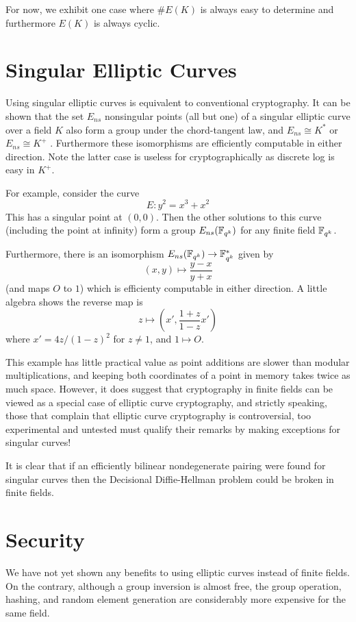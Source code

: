 For now, we exhibit one case where $\#E(K)$ is always easy to determine
and furthermore $E(K)$ is always cyclic.

\section {Singular Elliptic Curves}

Using singular elliptic curves
is equivalent to conventional cryptography.
It can be shown that the set $E_{ns}$ nonsingular points (all but
one) of a singular elliptic curve over a field $K$
also form a group under the chord-tangent law,
and $E_{ns} \cong K^*$ or $E_{ns} \cong K^+$ \cite[Proposition 2.5]{silverman}.
Furthermore these isomorphisms are efficiently computable in either
direction.
Note the latter case is useless for cryptographically
as discrete log is easy in $K^+$.

For example, consider the curve
\[ E : y^2 = x^3 + x^2 \]
This has a singular point at $(0,0)$. Then the other solutions to
this curve (including the point at infinity) form a group
$E_{ns}(\mathbb{F}_{q^k})$ for any finite field $\mathbb{F}_{q^k}$.

Furthermore, there is an isomorphism $E_{ns}(\mathbb{F}_{q^k}) \rightarrow \mathbb{F}_{q^k}^*$
given by
\[ (x,y) \mapsto \frac{y-x}{y+x} \]
(and maps $O$ to $1$)
which is efficienty computable in either direction.
A little algebra
shows the reverse map is
\[ z \mapsto \left( x', \frac{1+z}{1-z} x' \right) \]
where $x' = 4z/(1-z)^2$ for $z \ne 1$, and $1 \mapsto O$.

This example has little practical value as point additions are slower than
modular multiplications, and keeping both coordinates of a point in memory
takes twice as much space. However, it does suggest
that cryptography in finite fields can be viewed as a special
case of elliptic curve cryptography, and strictly speaking,
those that complain that elliptic curve cryptography is controversial,
too experimental and untested must qualify
their remarks by making exceptions for singular curves!

It is clear that if an efficiently bilinear nondegenerate pairing were found
for singular curves then the Decisional Diffie-Hellman problem could be broken
in finite fields.

\section {\label{sec:eccsec}Security}

We have not yet shown any benefits to using elliptic curves instead
of finite fields. On the contrary, although a group inversion is
almost free, the group operation, hashing, and random element generation
are considerably more expensive for the same field.

